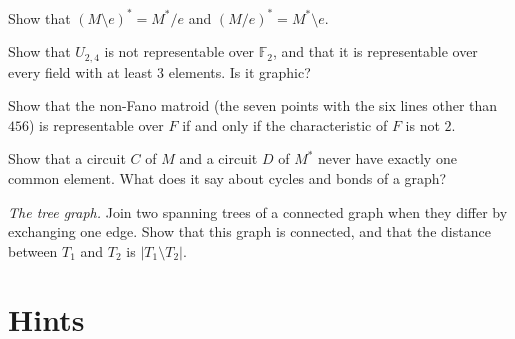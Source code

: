 \begin{exercise}[$\star\star$]\label{ex:minordual}
Show that $(M\setminus e)^*=M^*/e$ and $(M/e)^*=M^*\setminus e$.
\end{exercise}

\begin{exercise}[$\star$]\label{ex:u24}
Show that $U_{2,4}$ is not representable over $\mathbb F_2$, and that it is representable over every field with at least $3$ elements. Is it graphic?
\end{exercise}

\begin{exercise}[$\star\star$]\label{ex:nonfano}
Show that the non-Fano matroid (the seven points with the six lines other than $456$) is representable over $F$ if and only if the characteristic of $F$ is not $2$.
\end{exercise}

\begin{exercise}[$\star$]\label{ex:orthogonal}
Show that a circuit $C$ of $M$ and a circuit $D$ of $M^*$ never have exactly one common element. What does it say about cycles and bonds of a graph?
\end{exercise}

\begin{exercise}[$\star$]\label{ex:treegraph}
\emph{The tree graph.} Join two spanning trees of a connected graph when they differ by exchanging one edge. Show that this graph is connected, and that the distance between $T_1$ and $T_2$ is $|T_1\setminus T_2|$.
\end{exercise}

\section{Hints}

